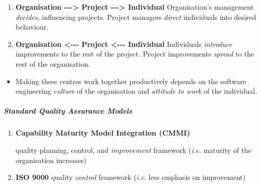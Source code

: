 \documentclass[a4paper]{article}
\providecommand{\tightlist}{%
  \setlength{\itemsep}{0pt}\setlength{\parskip}{0pt}}
\let\oldsubparagraph\subparagraph
\renewcommand{\subparagraph}[1]{\oldsubparagraph{#1}\mbox{}}
\begin{document}
\begin{itemize}
  \begin{enumerate}
  \def\labelenumi{\arabic{enumi}.}
  \tightlist
  \item
    \textbf{Organisation -\/-\/-\textgreater{} Project
    -\/-\/-\textgreater{} Individual} Organisation's management
    \emph{decides}, influencing projects. Project managers \emph{direct}
    individuals into desired behaviour.
  \item
    \textbf{Organisation \textless{}-\/-\/- Project \textless{}-\/-\/-
    Individual} Individuals \emph{introduce} improvements to the rest of
    the project. Project improvements \emph{spread} to the rest of the
    organisation.
  \end{enumerate}

  \begin{itemize}
  \tightlist
  \item
    Making these centres work together productively depends on the
    software engineering \emph{culture} of the organisation and
    \emph{attitude to work} of the individual.
  \end{itemize}
\end{itemize}

\hypertarget{standard-quality-assurance-models}{%
\subparagraph{Standard Quality Assurance
Models}\label{standard-quality-assurance-models}}

\begin{enumerate}
\def\labelenumi{\arabic{enumi}.}
\item
  \textbf{Capability Maturity Model Integration (CMMI)}

  quality planning, control, and \emph{improvement} framework
  (\emph{i.e.} maturity of the organisation increases)
\item
  \textbf{ISO 9000} quality \emph{control} framework (\emph{i.e.} less
  emphasis on improvement)
\end{enumerate}
\end{document}
